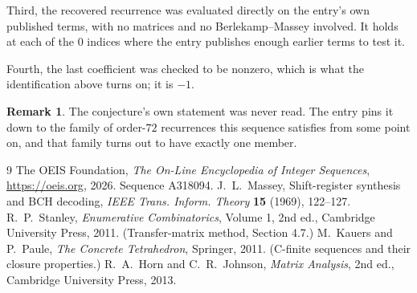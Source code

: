 \documentclass[11pt,a4paper]{article}
\theoremstyle{plain}
\theoremstyle{definition}
\newtheorem{remark}[theorem]{Remark}
\begin{document}
Third, the recovered recurrence was evaluated directly on the entry's own published terms, with
no matrices and no Berlekamp--Massey involved. It holds at each of the $0$ indices where
the entry publishes enough earlier terms to test it.

Fourth, the last coefficient was checked to be nonzero, which is what the identification above
turns on; it is $-1$.

\begin{remark}
The conjecture's own statement was never read. The entry pins it down to the family of
order-$72$ recurrences this sequence satisfies from some point on, and that family turns
out to have exactly one member.
\end{remark}

\begin{thebibliography}{9}
 The OEIS Foundation, \emph{The On-Line Encyclopedia of Integer
Sequences}, \url{https://oeis.org}, 2026. Sequence A318094.
 J.~L.~Massey, Shift-register synthesis and BCH decoding, \emph{IEEE
Trans. Inform. Theory} \textbf{15} (1969), 122--127.
 R.~P.~Stanley, \emph{Enumerative Combinatorics}, Volume 1, 2nd ed.,
Cambridge University Press, 2011. (Transfer-matrix method, Section 4.7.)
 M.~Kauers and P.~Paule, \emph{The Concrete Tetrahedron}, Springer, 2011.
(C-finite sequences and their closure properties.)
 R.~A.~Horn and C.~R.~Johnson, \emph{Matrix Analysis}, 2nd ed., Cambridge
University Press, 2013.
\end{thebibliography}
\end{document}
